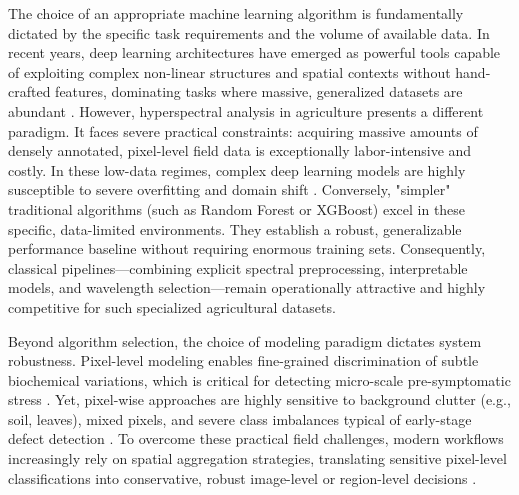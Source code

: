 \medskip
\noindent
The choice of an appropriate machine learning algorithm is fundamentally dictated by the specific task requirements and the volume of available data. In recent years, deep learning architectures have emerged as powerful tools capable of exploiting complex non-linear structures and spatial contexts without hand-crafted features, dominating tasks where massive, generalized datasets are abundant \parencite{Chen2024MutationHSI}. However, hyperspectral analysis in agriculture presents a different paradigm. It faces severe practical constraints: acquiring massive amounts of densely annotated, pixel-level field data is exceptionally labor-intensive and costly. In these low-data regimes, complex deep learning models are highly susceptible to severe overfitting and domain shift \parencite{ATTRI2023102217}. Conversely, "simpler" traditional algorithms (such as Random Forest or XGBoost) excel in these specific, data-limited environments. They establish a robust, generalizable performance baseline without requiring enormous training sets. Consequently, classical pipelines---combining explicit spectral preprocessing, interpretable models, and wavelength selection---remain operationally attractive and highly competitive for such specialized agricultural datasets.

\medskip
\noindent
Beyond algorithm selection, the choice of modeling paradigm dictates system robustness. Pixel-level modeling enables fine-grained discrimination of subtle biochemical variations, which is critical for detecting micro-scale pre-symptomatic stress \parencite{zhang2024hyperspectral}. Yet, pixel-wise approaches are highly sensitive to background clutter (e.g., soil, leaves), mixed pixels, and severe class imbalances typical of early-stage defect detection \parencite{RAM2024109037}. To overcome these practical field challenges, modern workflows increasingly rely on spatial aggregation strategies, translating sensitive pixel-level classifications into conservative, robust image-level or region-level decisions \parencite{LIU2025117630}.


